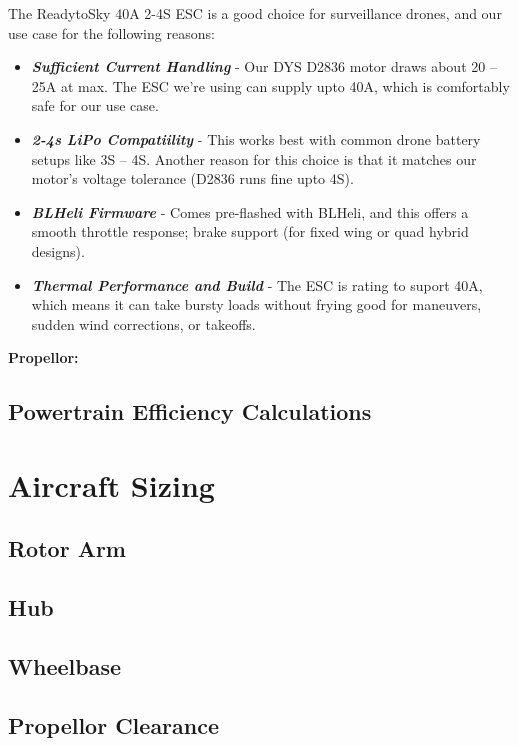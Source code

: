 \documentclass[12pt]{report}
\begin{document}
      The ReadytoSky 40A 2-4S ESC is a good choice for surveillance drones, and our use case for the following reasons:
      \begin{itemize}
        \item \textbf{\textit{Sufficient Current Handling}} - Our DYS D2836 motor draws about 20 -- 25A at max. The ESC we're using can supply upto 40A, which is comfortably safe for our use case.
        \item \textbf{\textit{2-4s LiPo Compatiility}} - This works best with common drone battery setups like 3S -- 4S. Another reason for this choice is that it matches our motor's voltage tolerance (D2836 runs fine upto 4S).
        \item \textbf{\textit{BLHeli Firmware}} - Comes pre-flashed  with BLHeli, and this offers a smooth throttle response; brake support (for fixed wing or quad hybrid designs).
        \item \textbf{\textit{Thermal Performance and Build}} - The ESC is rating to suport 40A, which means it can take bursty loads without frying good for maneuvers, sudden wind corrections, or takeoffs.
      \end{itemize}

      \vspace{0.5cm}
      \noindent \textbf{Propellor: } 

      \vspace{0.5cm}
      

      \subsection{Powertrain Efficiency Calculations}
    \section{Aircraft Sizing}
      \subsection*{Rotor Arm}
      \subsection*{Hub}
      \subsection*{Wheelbase}
      \subsection*{Propellor Clearance}
\end{document}
